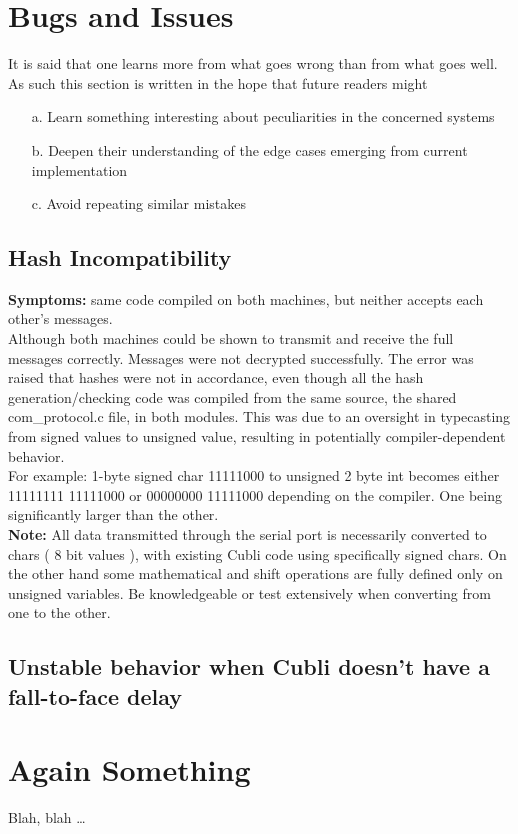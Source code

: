 \chapter{Bugs and Issues}\label{sec:bugsandissues}

It is said that one learns more from what goes wrong than from what goes well. As such this section is written in the hope that future readers might  
\begin{itemize}
\item[a.] Learn something interesting about peculiarities in the concerned systems
\item[b.] Deepen their understanding of the edge cases emerging from current implementation  
\item[c.]Avoid repeating similar mistakes 
\end{itemize}
 
\section{Hash Incompatibility}

\textbf{Symptoms:} same code compiled on both machines, but neither accepts each other's messages.\\
Although both machines could be shown to transmit and receive the full messages correctly. Messages were not decrypted successfully. The error was raised that hashes were not in accordance, even though all the hash generation/checking code was compiled from the same source, the shared com\_protocol.c file, in both modules. This was due to an oversight in typecasting from signed values to unsigned value, resulting in potentially compiler-dependent behavior. \\
For example: 1-byte signed char 11111000 to unsigned 2 byte int becomes either 11111111 11111000 or 00000000 11111000 depending on the compiler. One being significantly larger than the other.  \\
\textbf{Note:} All data transmitted through the serial port is necessarily converted to chars ( 8 bit values ), with existing Cubli code using specifically signed chars. On the other hand some mathematical and shift operations are fully defined only on unsigned variables. Be knowledgeable or test extensively when converting from one to the other.  
 
\section{Unstable behavior when Cubli doesn't have a fall-to-face delay} 

 \cleardoublepage


\chapter{Again Something}\label{sec:again_something}

Blah, blah \dots

 \cleardoublepage